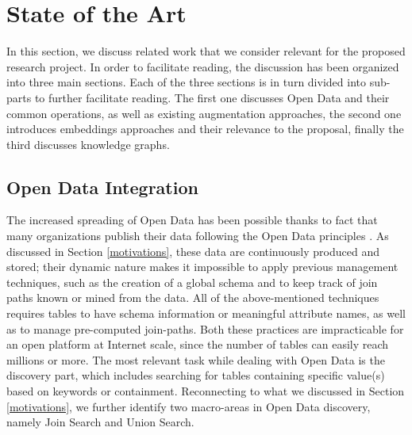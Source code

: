 \section{State of the Art}\label{related}
In this section, we discuss related work that we consider relevant for the proposed research project. In order to facilitate reading, the discussion has been organized into three main sections. Each of the three sections is in turn divided into sub-parts to further facilitate reading. The first one discusses Open Data and their common operations, as well as existing augmentation approaches, the second one introduces embeddings approaches and their relevance to the proposal, finally the third discusses knowledge graphs.

\subsection{Open Data Integration}
The increased spreading of Open Data has been possible thanks to fact that many organizations publish their data following the Open Data principles \cite{bizer2009linked}. As discussed in Section \ref{motivations}, these data are continuously produced and stored; their dynamic nature makes it impossible to apply previous management techniques, such as the creation of a global schema \cite{10.1145/27633.27634} and to keep track of join paths known or mined from the data\cite{fagin2009clio,deng2017data}. All of the above-mentioned techniques requires tables to have schema information or meaningful attribute names, as well as to manage pre-computed join-paths. Both these practices are impracticable for an open platform at Internet scale, since the number of tables can easily reach millions or more. The most relevant task while dealing with Open Data is the discovery part, which includes searching for tables containing specific value(s) based on keywords \cite{brickley2019google} or containment. Reconnecting to what we discussed in Section \ref{motivations}, we further identify two macro-areas in Open Data discovery, namely Join Search and Union Search.
\bigbreak

